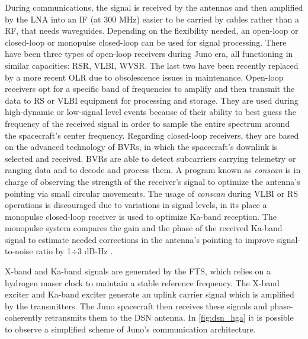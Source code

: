 During communications, the signal is received by the antennas and then amplified by the LNA into an IF (at 300 MHz) easier to be carried by cables rather than a RF, that needs waveguides.
Depending on the flexibility needed, an open-loop or closed-loop or monopulse closed-loop can be used for signal processing. There have been three types of open-loop receivers during Juno era, all functioning in similar capacities: RSR, VLBI, WVSR. The last two have been recently replaced by a more recent OLR due to obsolescence issues in maintenance\cite{communication_support}.
Open-loop receivers opt for a specific band of frequencies to amplify and then transmit the data to RS or VLBI equipment for processing and storage. They are used during high-dynamic or low-signal level events because of their ability to best guess the frequency of the received signal in order to sample the entire spectrum around the spacecraft's center frequency.
Regarding closed-loop receivers, they are based on the advanced technology of BVRs, in which the spacecraft's downlink is selected and received. BVRs are able to detect subcarriers carrying telemetry or ranging data and to decode and process them.
A program known as \textit{conscan} \cite{dsn_sito} is in charge of observing the strength of the receiver's signal to optimize the antenna's pointing via small circular movements. The usage of \textit{conscan} during VLBI or RS operations is discouraged due to variations in signal levels, in its place a monopulse closed-loop receiver is used to optimize Ka-band reception.
The monopulse system compares the gain and the phase of the received Ka-band signal to estimate needed corrections in the antenna's pointing to improve signal-to-noise ratio by 1$\div$3 dB-Hz \cite{ka_uplink}.

X-band and Ka-band signals are generated by the FTS, which relies on a hydrogen maser clock to maintain a stable reference frequency. The X-band exciter and Ka-band exciter generate an uplink carrier signal which is amplified by the transmitters.
The Juno spacecraft then receives these signals and phase-coherently retransmits them to the DSN antenna.
In \autoref{fig:dsn_hga} it is possible to observe a simplified scheme of Juno's communication architecture.
